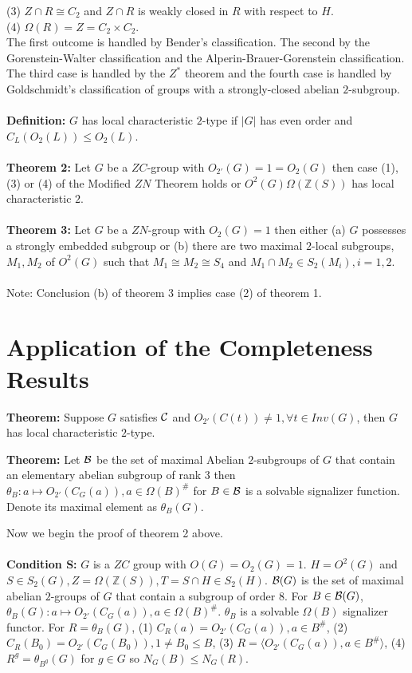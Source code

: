 (3) $Z \cap R \cong C_2$ and $Z \cap R$ is weakly closed in $R$ with respect to 
$H$.\\
(4) $\Omega(R)=Z= C_2 \times C_2$.
\\
The first outcome is handled by Bender's classification.  The second by the Gorenstein-Walter
classification and the Alperin-Brauer-Gorenstein classification.  The third case is handled by the $Z^*$
theorem and the fourth case is handled by Goldschmidt's classification of groups with a strongly-closed
abelian $2$-subgroup.
\\
\\
{\bf Definition:}  $G$ has local characteristic $2$-type if $|G|$ has even order and
$C_L(O_2(L)) \leq O_2(L)$.
\\
\\
{\bf Theorem 2:}  Let $G$ be a $ZC$-group with $O_{2'}(G)=1=O_2(G)$ then case (1), (3) or (4)
of the Modified $ZN$ Theorem holds or $O^2(G) \Omega({\mathbb Z}(S))$ has local characteristic $2$.
\\
\\
{\bf Theorem 3:} Let $G$ be a $ZN$-group with $O_2(G)= 1$ then either (a)
$G$ possesses a strongly embedded subgroup or (b) there are two maximal $2$-local subgroups,
$M_1, M_2$ of $O^2(G)$ such that $M_1 \cong M_2 \cong S_4$ and $M_1 \cap M_2 \in S_2(M_i), i = 1,2$.
\\
\\
Note: Conclusion (b) of theorem 3 implies case (2) of theorem 1.
\section{Application of the Completeness Results}
{\bf Theorem:}  Suppose $G$ satisfies ${\cal C}$ and $O_{2'}(C(t)) \ne 1, \forall t \in Inv(G)$,
then $G$ has local characteristic $2$-type.
\begin{quote}
\end{quote}
{\bf Theorem:} Let ${\cal B}$ be the set of maximal Abelian $2$-subgroups of $G$ that contain
an elementary abelian subgroup of rank $3$ then 
$\theta_B: a \mapsto O_{2'}(C_G(a)), a \in \Omega(B)^{\#}$ for $B \in {\cal B}$ is a solvable
signalizer function.  Denote its maximal element as $\theta_B(G)$.
\begin{quote}
\end{quote}
Now we begin the proof of theorem 2 above.
\\
\\
{\bf Condition {\cal S}:}  $G$ is a $ZC$ group with $O(G)= O_2(G)=1$.
$H=O^2(G)$ and
$S \in S_2(G), Z= \Omega({\mathbb Z}(S)), T= S \cap H \in S_2(H)$. ${\cal B}(G)$ is the set
of maximal abelian $2$-groups of $G$ that contain a subgroup of order $8$.   For $B \in {\cal B}(G)$,
$\theta_B(G): a \mapsto O_{2'}(C_G(a)), a \in \Omega(B)^\#$.  $\theta_B$ is a solvable $\Omega(B)$
signalizer functor.  For $R = \theta_B(G)$, (1) $C_R(a) = O_{2'}(C_G(a)), a \in B^\#$,
(2) $C_R(B_0) = O_{2'}(C_G(B_0)), 1 \neq B_0 \leq B$, (3) $R= \langle O_{2'}(C_G(a)), a \in B^\# \rangle$,
(4) $R^g = \theta_{B^g}(G)$ for $g \in G$ so $N_G(B) \leq N_G(R)$.
\\
\\
